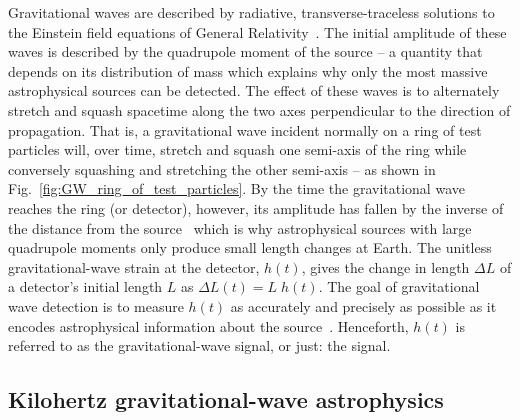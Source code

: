 Gravitational waves are described by radiative, transverse-traceless solutions to the Einstein field equations of General Relativity~\cite{}. %
The initial amplitude of these waves is described by the quadrupole moment of the source -- a quantity that depends on its distribution of mass which explains why only the most massive astrophysical sources can be detected. %
The effect of these waves is to alternately stretch and squash spacetime along the two axes perpendicular to the direction of propagation. That is, a gravitational wave incident normally on a ring of test particles will, over time, stretch and squash one semi-axis of the ring while conversely squashing and stretching the other semi-axis -- as shown in Fig.~\ref{fig:GW_ring_of_test_particles}. 
By the time the gravitational wave reaches the ring (or detector), however, its amplitude has fallen by the inverse of the distance from the source~\cite{} which is why astrophysical sources with large quadrupole moments only produce small length changes at Earth. %
The unitless gravitational-wave strain at the detector, $h(t)$, gives the change in length $\Delta L$ of a detector's initial length $L$ as $\Delta L(t) = L \;h(t)$. The goal of gravitational wave detection is to measure $h(t)$ as accurately and precisely as possible as it encodes astrophysical information about the source~\cite{}. Henceforth, $h(t)$ is referred to as the gravitational-wave signal, or just: the signal.



\subsection{Kilohertz gravitational-wave astrophysics} %

